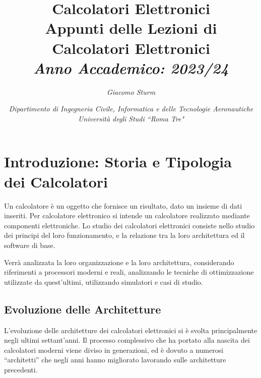 \documentclass{article}
\numberwithin{equation}{subsection}
\begin{document}
\title{%
    \textbf{Calcolatori Elettronici}  \\ 
    \large Appunti delle Lezioni di Calcolatori Elettronici \\
    \textit{Anno Accademico: 2023/24}}
\author{\textit{Giacomo Sturm}}
\date{\textit{Dipartimento di Ingegneria Civile, Informatica e delle Tecnologie Aeronautiche \\
Università degli Studi ``Roma Tre"}}

\maketitle
\thispagestyle{link}

\clearpage


\pagestyle{fancy}
\fancyhead{}\fancyfoot{}
\fancyfoot[C]{\thepage}

\tableofcontents

\clearpage
{}


\section{Introduzione: Storia e Tipologia dei Calcolatori}

Un calcolatore è un oggetto che fornisce un risultato, dato un insieme di dati inseriti. Per calcolatore elettronico si intende un calcolatore realizzato mediante componenti elettroniche. 
Lo studio dei calcolatori elettronici consiste nello studio dei principi del loro funzionamento, e la relazione tra la loro architettura ed il software di base. 

Verrà analizzata la loro organizzazione e la loro architettura, considerando riferimenti a processori moderni e reali, analizzando le tecniche di ottimizzazione utilizzate da quest'ultimi, utilizzando 
simulatori e casi di studio. 

\subsection{Evoluzione delle Architetture}

L'evoluzione delle architetture dei calcolatori elettronici si è svolta principalmente negli ultimi settant'anni. Il processo complessivo che ha portato alla nascita 
dei calcolatori moderni viene diviso in generazioni, ed è dovuto a numerosi ``architetti'' che negli anni hanno migliorato lavorando sulle architetture precedenti. 
\end{document}
